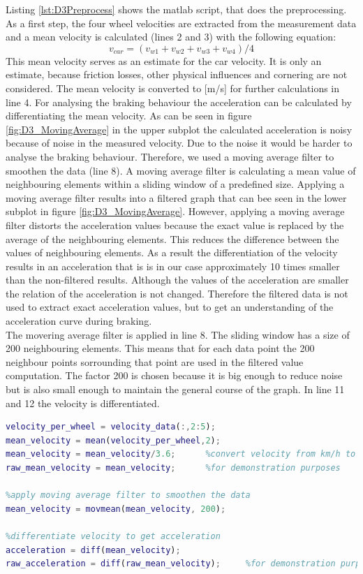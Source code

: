 Listing \ref{lst:D3Preprocess} shows the matlab script, that does the preprocessing.
As a first step, the four wheel velocities are extracted from the measurement data and a mean velocity is calculated (lines 2 and 3) with the following equation:
\begin{equation}
	v_{car} = (v_{w1} +v_{w2} + v_{w3} +v_{w4})/4
\end{equation}
This mean velocity serves as an estimate for the car velocity.
It is only an estimate, because friction losses, other physical influences and cornering are not considered.
The mean velocity is converted to [m/s] for further calculations in line 4.
For analysing the braking behaviour the acceleration can be calculated by differentiating the mean velocity.
As can be seen in figure \ref{fig:D3_MovingAverage} in the upper subplot the calculated acceleration is noisy because of noise in the measured velocity.
Due to the noise it would be harder to analyse the braking behaviour. Therefore, we used a moving average filter to smoothen the data (line 8).
A moving average filter is calculating a mean value of neighbouring elements within a sliding window of a predefined size.
Applying a moving average filter results into a filtered graph that can bee seen in the lower subplot in figure \ref{fig:D3_MovingAverage}. 
However, applying a moving average filter distorts the acceleration values because the exact value is replaced by the average of the neighbouring elements. This reduces the difference between the values of neighbouring elements.
As a result the differentiation of the velocity results in an acceleration that is is in our case approximately 10 times smaller than the non-filtered results.
Although the values of the acceleration are smaller the relation of the acceleration is not changed.
Therefore the filtered data is not used to extract exact acceleration values, but to get an understanding of the acceleration curve during braking.\\

The movering average filter is applied in line 8. The sliding window has a size of 200 neighbouring elements. This means that for each data point the 200 neighbour points sorrounding that point are used in the filtered value computation. The factor 200 is chosen because it is big enough to reduce noise but is also small enough to maintain the general course of the graph. In line 11 and 12 the velocity is differentiated.
\begin{lstlisting}[language=Matlab,basicstyle=\scriptsize	,caption= Preprocessing measurement data,label= lst:D3Preprocess]
%compute mean velocity of all 4 wheels
velocity_per_wheel = velocity_data(:,2:5);
mean_velocity = mean(velocity_per_wheel,2);
mean_velocity = mean_velocity/3.6;      %convert velocity from km/h to m/s
raw_mean_velocity = mean_velocity;      %for demonstration purposes

%apply moving average filter to smoothen the data
mean_velocity = movmean(mean_velocity, 200); 

%differentiate velocity to get acceleration
acceleration = diff(mean_velocity);
raw_acceleration = diff(raw_mean_velocity);     %for demonstration purposes
\end{lstlisting}

